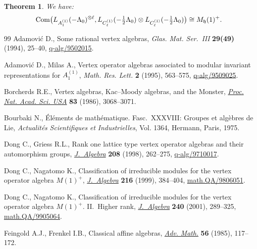 \documentclass[11pt]{article}
\newtheorem{theorem}{Theorem}
\newcommand{\1}{\bf 1}
\begin{document}
\begin{theorem} \label{coset-bos-r-higher}We have:
\[ {\rm Com} \big( L_{A_1 ^{(1)}}(- \Lambda_0) ^{\otimes
\ell},L_{C_{\ell} ^{(1)}}(-\tfrac{1}{2}\Lambda_0) \otimes
L_{C_{\ell} ^{(1)}}(-\tfrac{1}{2}\Lambda_0) \big) \cong M_{\frak h} (1)
^+.\]
\end{theorem}
\begin{thebibliography}{99}
Adamovi{\'c} D., Some rational vertex algebras, \textit{Glas. Mat. Ser.~III}
  \textbf{29(49)} (1994), 25--40, \href{http://arxiv.org/abs/q-alg/9502015}{q-alg/9502015}.

Adamovi{\'c} D., Milas A., Vertex operator algebras associated to modular
  invariant representations for {$A^{(1)}_1$}, \textit{Math. Res. Lett.}
  \textbf{2} (1995), 563--575, \href{http://arxiv.org/abs/q-alg/9509025}{q-alg/9509025}.

Borcherds R.E., Vertex algebras, {K}ac--{M}oody algebras, and the {M}onster,
  \href{http://dx.doi.org/10.1073/pnas.83.10.3068}{\textit{Proc. Nat. Acad. Sci. USA}} \textbf{83} (1986), 3068--3071.

Bourbaki N., \'El\'ements de math\'ematique. Fasc.~XXXVIII: Groupes et
  alg\`ebres de Lie, \textit{Actualit\'es Scientifiques et Industrielles}, Vol.
  1364, Hermann, Paris, 1975.

Dong C., Griess R.L., Rank one lattice type vertex operator algebras and their
  automorphism groups, \href{http://dx.doi.org/10.1006/jabr.1998.7498}{\textit{J.~Algebra}} \textbf{208} (1998), 262--275,
  \href{http://arxiv.org/abs/q-alg/9710017}{q-alg/9710017}.

Dong C., Nagatomo K., Classif\/ication of irreducible modules for the vertex
  operator algebra {$M(1)^+$}, \href{http://dx.doi.org/10.1006/jabr.1998.7784}{\textit{J.~Algebra}} \textbf{216} (1999),
  384--404, \href{http://arxiv.org/abs/math.QA/9806051}{math.QA/9806051}.

Dong C., Nagatomo K., Classif\/ication of irreducible modules for the vertex
  operator algebra {$M(1)^+$}. {II}.~{H}igher rank, \href{http://dx.doi.org/10.1006/jabr.2000.8716}{\textit{J.~Algebra}}
  \textbf{240} (2001), 289--325, \href{http://arxiv.org/abs/math.QA/9905064}{math.QA/9905064}.

Feingold A.J., Frenkel I.B., Classical af\/f\/ine algebras, \href{http://dx.doi.org/10.1016/0001-8708(85)90027-1}{\textit{Adv. Math.}}
  \textbf{56} (1985), 117--172.


\end{thebibliography}
\end{document}
